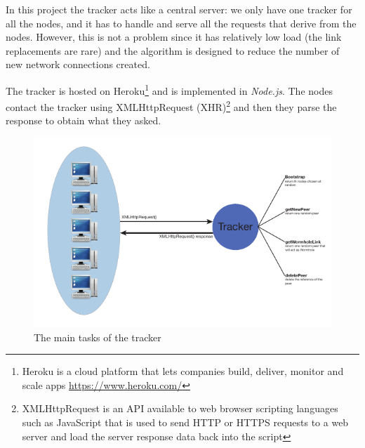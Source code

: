 In this project the tracker acts like a central server: we only have one tracker for all the nodes, and it has to handle and serve all the requests that derive from the nodes. However, this is not a problem since it has relatively low load (the link replacements are rare) and the algorithm is designed to reduce the number of new network connections created. 

The tracker is hosted on Heroku\footnote{Heroku is a cloud platform that lets companies build, deliver, monitor and scale apps \url{https://www.heroku.com/}} and is implemented in \textit{Node.js}. The nodes contact the tracker using XMLHttpRequest (XHR)\footnote{XMLHttpRequest is an API available to web browser scripting languages such as JavaScript that is used to send HTTP or HTTPS requests to a web server and load the server response data back into the script} and then they parse the response to obtain what they asked.

\begin{figure}[ht]
  \centering
  \includegraphics[keepaspectratio=true, width=\textwidth]{images/tracker}\caption{The main tasks of the tracker}
  \label{fig:tracker}
\end{figure}

